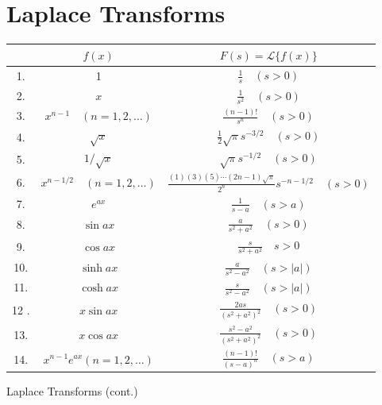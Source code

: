 \documentclass[10pt]{article}
\begin{document}
\section*{Laplace Transforms}
\begin{center}
\begin{tabular}{|c|c|c|}
\hline
 & $f(x)$ & $F(s)=\mathscr{L}\{f(x)\}$ \\
\hline
1. & 1 & $\frac{1}{s} \quad(s>0)$ \\
\hline
2. & $x$ & $\frac{1}{s^{2}} \quad(s>0)$ \\
\hline
3. & $x^{n-1} \quad(n=1,2, \ldots)$ & $\frac{(n-1) !}{s^{n}} \quad(s>0)$ \\
\hline
4. & $\sqrt{x}$ & $\frac{1}{2} \sqrt{\pi} s^{-3 / 2} \quad(s>0)$ \\
\hline
5. & $1 / \sqrt{x}$ & $\sqrt{\pi} s^{-1 / 2} \quad(s>0)$ \\
\hline
6. & $x^{n-1 / 2} \quad(n=1,2, \ldots)$ & $\frac{(1)(3)(5) \cdots(2 n-1) \sqrt{\pi}}{2^{n}} s^{-n-1 / 2} \quad(s>0)$ \\
\hline
7. & $e^{a x}$ & $\frac{1}{s-a} \quad(s>a)$ \\
\hline
8. & $\sin a x$ & $\frac{a}{s^{2}+a^{2}} \quad(s>0)$ \\
\hline
9. & $\cos a x$ & $\frac{s}{s^{2}+a^{2}} \quad s>0$ \\
\hline
10. & $\sinh a x$ & $\frac{a}{s^{2}-a^{2}} \quad(s>|a|)$ \\
\hline
11. & $\cosh a x$ & $\frac{s}{s^{2}-a^{2}} \quad(s>|a|)$ \\
\hline
12 . & $x \sin a x$ & $\frac{2 a s}{\left(s^{2}+a^{2}\right)^{2}} \quad(s>0)$ \\
\hline
13. & $x \cos a x$ & $\frac{s^{2}-a^{2}}{\left(s^{2}+a^{2}\right)^{2}} \quad(s>0)$ \\
\hline
14. & $x^{n-1} e^{a x}(n=1,2, \ldots)$ & $\frac{(n-1) !}{(s-a)^{n}} \quad(s>a)$ \\
\hline
\end{tabular}
\end{center}

Laplace Transforms (cont.)
\end{document}
